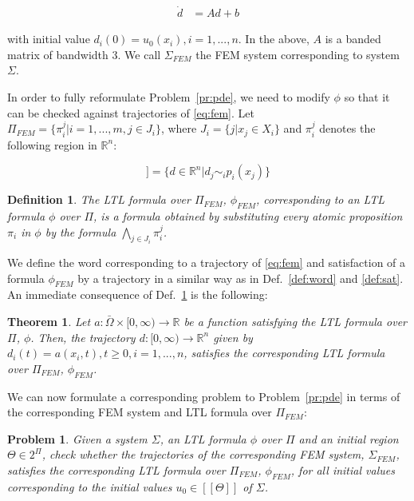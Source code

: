 \documentclass{article}
\newtheorem{theorem}{Theorem}
\newtheorem{definition}{Definition}
\newtheorem{problem}{Problem}
\newcommand*{\R}{\mathbb{R}}
\newcommand*{\psat}[1]{[[#1]]}
\begin{document}
\begin{equation}\label{eq:fem}
    \begin{aligned}
        \dot{d} &= A d + b
    \end{aligned}
\end{equation}

with initial value $d_i(0) = u_0(x_i), i = 1,...,n$. In the above, $A$ is a
banded matrix of bandwidth 3. We call $\Sigma_{FEM}$ the FEM system
corresponding to system $\Sigma$.

In order to fully reformulate Problem~\ref{pr:pde}, we need to modify $\phi$ so
that it can be checked against trajectories of \eqref{eq:fem}. Let $\Pi_{FEM} =
\{\pi_i^j | i =1,...,m, j \in J_i\}$, where $J_i = \{j | x_j \in X_i\}$ and
$\pi_i^j$ denotes the following region in $\R^n$:

\begin{equation}
    \psat{\pi_i^j} = \{d \in \R^n | d_j \sim_i p_i(x_j)\}
\end{equation}

\begin{definition}\label{def:femformula}
    The LTL formula over $\Pi_{FEM}$, $\phi_{FEM}$, corresponding to an LTL formula
    $\phi$ over $\Pi$, is a formula obtained by substituting every atomic
    proposition $\pi_i$ in $\phi$ by the formula $\bigwedge_{j \in J_i}
    \pi_i^j$.
\end{definition}

We define the word corresponding to a trajectory of \eqref{eq:fem} and
satisfaction of a formula $\phi_{FEM}$ by a trajectory in a similar way as in
Def.~\ref{def:word} and \ref{def:sat}. An immediate consequence of
Def.~\ref{def:femformula} is the following:

\begin{theorem}\label{th:equiv}
    Let $a : \bar\Omega \times [0, \infty) \rightarrow \R$ be a function
    satisfying the LTL formula over $\Pi$, $\phi$. Then, the trajectory $d : [0,
    \infty) \rightarrow \R^n$ given by $d_i(t) = a(x_i, t), t \geq 0, i =
    1,...,n$, satisfies the corresponding LTL formula over $\Pi_{FEM}$, $\phi_{FEM}$.
\end{theorem}

We can now formulate a corresponding problem to Problem~\ref{pr:pde} in terms of 
the corresponding FEM system and LTL formula over $\Pi_{FEM}$:

\begin{problem}\label{pr:fem}
    Given a system $\Sigma$, an LTL formula $\phi$ over $\Pi$ and an initial
    region $\Theta \in 2^\Pi$, check whether the trajectories of the corresponding
    FEM system, $\Sigma_{FEM}$, satisfies the corresponding LTL formula over
    $\Pi_{FEM}$, $\phi_{FEM}$, for all initial values corresponding to the
    initial values $u_0 \in \psat{\Theta}$ of $\Sigma$.
\end{problem}
\end{document}
